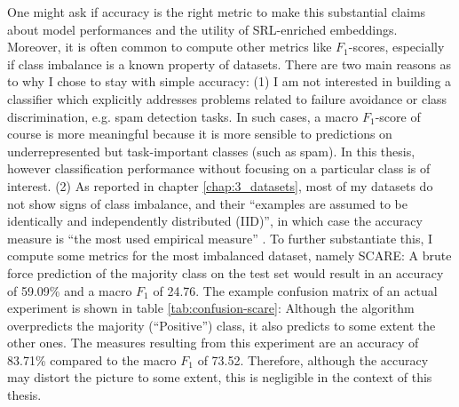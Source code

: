 One might ask if accuracy is the right metric to make this substantial claims
about model performances and the utility of SRL-enriched embeddings. Moreover, it is
often common to compute other metrics like $F_1$-scores, especially if class imbalance
is a known property of datasets. There are two main reasons as to why I chose to stay
with simple accuracy: (1) I am not interested in building a classifier which explicitly
addresses problems related to failure avoidance or class discrimination, e.g. spam
detection tasks. In such cases, a macro $F_1$-score of course is more meaningful because it
is more sensible to predictions on underrepresented but task-important classes (such
as spam). In this thesis, however classification performance without focusing on a
particular class is of interest. (2) As reported in chapter \ref{chap:3_datasets}, most
of my datasets do not show signs of class imbalance, and their ``examples are assumed
to be identically and independently distributed (IID)'', in which case the accuracy measure is
``the most used empirical measure'' \citep{sokolova2006beyond}. To further substantiate
this, I compute some metrics for the most imbalanced dataset, namely
SCARE: A brute force prediction of the majority class on the test set would
result in an accuracy of 59.09\% and a macro $F_1$ of 24.76. The example confusion
matrix of an actual experiment is shown in table \ref{tab:confusion-scare}: Although
the algorithm overpredicts the majority (``Positive'') class, it also predicts to some
extent the other ones. The measures resulting from this experiment are an accuracy of
83.71\% compared to the macro $F_1$ of 73.52. Therefore, although the accuracy may distort
the picture to some extent, this is negligible in the context of this thesis.



